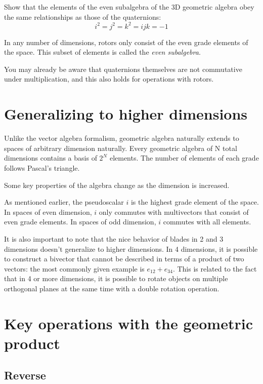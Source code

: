 \begin{expl}
    Show that the elements of the even subalgebra of the 3D geometric algebra obey the same 
    relationships as those of the quaternions: $$i^2 = j^2 = k^2 = ijk = -1$$
\end{expl}

In any number of dimensions, rotors only consist of the even grade elements of the space. This
subset of elements is called the \textit{even subalgebra}.

You may already be aware that quaternions themselves are not commutative under multiplication, and
this also holds for operations with rotors.

\section{Generalizing to higher dimensions}

Unlike the vector algebra formalism, geometric algebra naturally extends to spaces of arbitrary
dimension naturally. Every geometric algebra of N total dimensions contains a basis of $2^N$
elements. The number of elements of each grade follows Pascal's triangle.

Some key properties of the algebra change as the dimension is increased.

As mentioned earlier, the pseudoscalar $i$ is the highest grade element of the space. In spaces of
even dimension, $i$ only commutes with multivectors that consist of even grade elements. In spaces
of odd dimension, $i$ commutes with all elements.

It is also important to note that the nice behavior of blades in 2 and 3 dimensions doesn't 
generalize to higher dimensions. In 4 dimensions, it is possible to construct a bivector that
cannot be described in terms of a product of two vectors: the most commonly given example is
$e_{12} + e_{34}$. This is related to the fact that in 4 or more dimensions, it is possible to 
rotate objects on multiple orthogonal planes at the same time with a double rotation operation.

\section{Key operations with the geometric product}

\subsection{Reverse}

